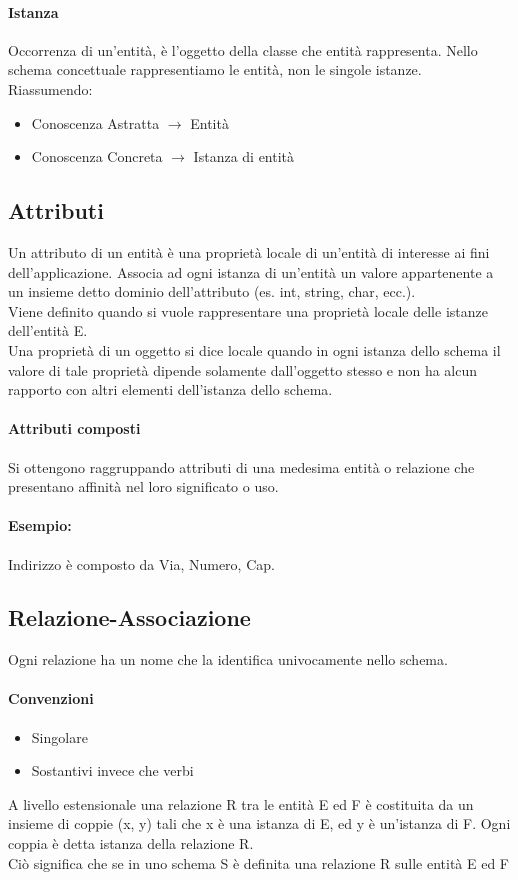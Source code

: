 \paragraph*{Istanza}
Occorrenza di un'entità, è l'oggetto della classe che entità rappresenta. Nello schema
concettuale rappresentiamo le entità, non le singole istanze.
\\ Riassumendo:
\begin{itemize}
    \item Conoscenza Astratta $\rightarrow$ Entità
    \item Conoscenza Concreta $\rightarrow$ Istanza di entità
\end{itemize}
\subsection*{Attributi}
Un attributo di un entità è una proprietà locale di un'entità di interesse ai
fini dell'applicazione. Associa ad ogni istanza di un'entità un valore appartenente
a un insieme detto dominio dell'attributo (es. int, string, char, ecc.).
\\ Viene definito quando si vuole rappresentare una proprietà locale
delle istanze dell'entità E.
\\ Una proprietà di un oggetto si dice locale quando in ogni istanza dello schema il valore
di tale proprietà dipende solamente dall'oggetto stesso e non ha alcun rapporto
con altri elementi dell'istanza dello schema.
\paragraph*{Attributi composti}
Si ottengono raggruppando attributi di una medesima entità o relazione che
presentano affinità nel loro significato o uso.
\paragraph*{Esempio:} Indirizzo è composto da Via, Numero, Cap.
\subsection*{Relazione-Associazione}
Ogni relazione ha un nome che la identifica univocamente nello schema.
\paragraph*{Convenzioni}
\begin{itemize}
    \item Singolare
    \item Sostantivi invece che verbi
\end{itemize}
A livello estensionale una relazione R tra le entità E ed F è costituita da un
insieme di coppie (x, y) tali che x è una istanza di E, ed y è un'istanza di F.
Ogni coppia è detta istanza della relazione R.
\\ Ciò significa che se in uno schema S è definita una relazione R sulle entità E ed F
